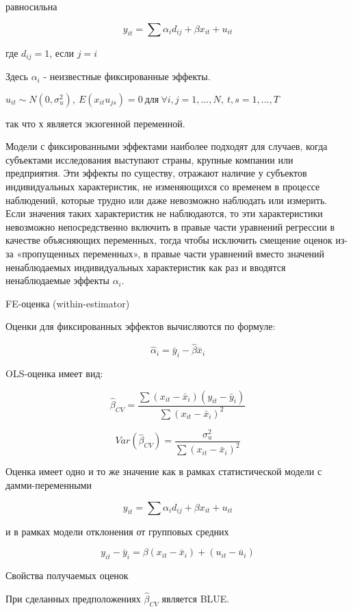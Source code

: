 \documentclass[a4paper,8pt]{article} %
\begin{document}
равносильна

$$ y_{it}  = \sum \alpha_i d_{ij} + \beta x_{it}+ u_{it}$$ 

где $d_{ij} = 1$, если $j = i$

Здесь $\alpha_i$ -  неизвестные фиксированные  эффекты. 



$u_{it} \sim N(0, \sigma^2_u), \  E(x_{it}u_{js}) = 0 \ для \ \forall  i , j = 1, ..., N, \ t, s = 1, ..., T $ 

так что х является экзогенной переменной.




Модели с фиксированными эффектами наиболее подходят для случаев, когда субъектами исследования выступают страны, крупные компании или предприятия. Эти эффекты по существу, отражают наличие у субъектов индивидуальных характеристик, не изменяющихся со временем в процессе наблюдений, которые трудно или даже невозможно наблюдать или измерить.
Если значения таких характеристик не наблюдаются,
то эти характеристики невозможно непосредственно включить в правые
части уравнений регрессии в качестве объясняющих переменных, тогда
чтобы исключить смещение оценок из-за «пропущенных переменных», в правые части уравнений вместо значений ненаблюдаемых индивидуальных характеристик как раз и вводятся ненаблюдаемые эффекты $\alpha_i$. 


FE-оценка (within-estimator)

Оценки для фиксированных эффектов вычисляются по формуле:

$$\hat{\alpha}_i = \bar{y}_i - \hat{\beta} \bar{x}_i $$

OLS-оценка имеет вид:


$$\hat{\beta}_{CV} = \frac{\sum(x_{it} - \bar{x}_i)(y_{it} - \bar{y}_i)}{\sum (x_{it} - \bar{x}_i)^2 }$$


$$Var(\hat{\beta}_{CV}) = \frac{ \sigma^2_u }{\sum (x_{it} - \bar{x}_i)^2 }$$


Оценка имеет одно и то же значение как в рамках статистической
модели с дамми-переменными

$$ y_{it}  = \sum \alpha_i d_{ij} + \beta x_{it}+ u_{it}$$ 

и в рамках модели отклонения от групповых средних 

$$y_{it} - \bar{y}_i = \beta (x_{it} - \bar{x}_i )  + (u_{it} - \bar{u}_i) $$  


Свойства получаемых оценок

При сделанных предположениях $\hat{\beta}_{CV}$ является BLUE. 
\end{document}
